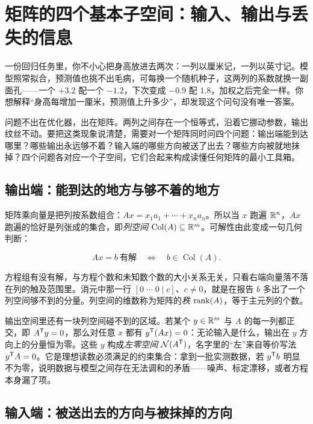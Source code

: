 \section{矩阵的四个基本子空间：输入、输出与丢失的信息}
\label{sec:03-Linear-Algebra/02-Vector-Spaces/03}

一份回归任务里，你不小心把身高放进去两次：一列以厘米记，一列以英寸记。模型照常拟合，预测值也挑不出毛病，可每换一个随机种子，这两列的系数就换一副面孔——一个 \(+3.2\) 配一个 \(-1.2\)，下次变成 \(-0.9\) 配 \(1.8\)，加权之后完全一样。你想解释``身高每增加一厘米，预测值上升多少''，却发现这个问句没有唯一答案。

问题不出在优化器，出在矩阵。两列之间存在一个恒等式，沿着它挪动参数，输出纹丝不动。要把这类现象说清楚，需要对一个矩阵同时问四个问题：输出端能到达哪里？哪些输出永远够不着？输入端的哪些方向被送了出去？哪些方向被就地抹掉？四个问题各对应一个子空间，它们合起来构成读懂任何矩阵的最小工具箱。

\subsection{输出端：能到达的地方与够不着的地方}

矩阵乘向量是把列按系数组合：\(Ax=x_1a_1+\cdots+x_na_n\)。所以当 \(x\) 跑遍 \(\mathbb{R}^n\)，\(Ax\) 跑遍的恰好是列张成的集合，即\emph{列空间} \(\operatorname{Col}(A)\subseteq\mathbb{R}^m\)。可解性由此变成一句几何判断：

\[
Ax=b\ \text{有解}\quad\Longleftrightarrow\quad b\in\operatorname{Col}(A).
\]

方程组有没有解，与方程个数和未知数个数的大小关系无关，只看右端向量落不落在列的触及范围里。消元中那一行 \([0\;\cdots\;0\mid c]\)、\(c\neq0\)，就是在报告 \(b\) 多出了一个列空间够不到的分量。列空间的维数称为矩阵的\emph{秩} \(\operatorname{rank}(A)\)，等于主元列的个数。

输出空间里还有一块列空间碰不到的区域。若某个 \(y\in\mathbb{R}^m\) 与 \(A\) 的每一列都正交，即 \(A^{\mathsf{T}}y=0\)，那么对任意 \(x\) 都有 \(y^{\mathsf{T}}(Ax)=0\)：无论输入是什么，输出在 \(y\) 方向上的分量恒为零。这些 \(y\) 构成\emph{左零空间} \(\mathcal N(A^{\mathsf{T}})\)，名字里的``左''来自等价写法 \(y^{\mathsf{T}}A=0\)。它是理想读数必须满足的约束集合：拿到一批实测数据，若 \(y^{\mathsf{T}}b\) 明显不为零，说明数据与模型之间存在无法调和的矛盾——噪声、标定漂移，或者方程本身漏了项。

\subsection{输入端：被送出去的方向与被抹掉的方向}


